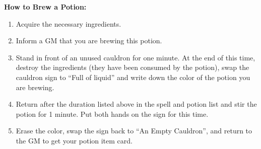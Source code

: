 \documentclass[green]{NeptuneBall}
\begin{document}
{\bf How to Brew a Potion:}\\
\begin{enumerate}
  \item Acquire the necessary ingredients.
	\item Inform a GM that you are brewing this potion.
  \item Stand in front of an unused cauldron for one minute. At the end of this time, destroy the ingredients (they have been consumed by the potion), swap the cauldron sign to ``Full of liquid'' and write down the color of the potion you are brewing.
  \item Return after the duration listed above in the spell and potion list and stir the potion for 1 minute. Put both hands on the sign for this time.
  \item Erase the color, swap the sign back to ``An Empty Cauldron'', and return to the GM to get your potion item card.
\end{enumerate}
\end{document}

